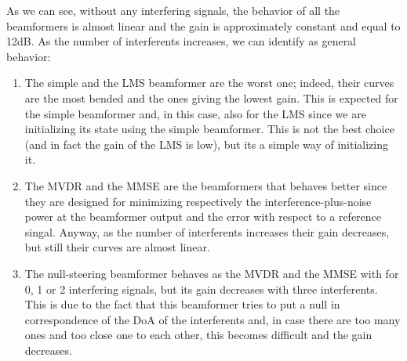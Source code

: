 As we can see, without any interfering signals, the behavior of all the beamformers is almost linear and the gain is 
approximately constant and equal to 12dB.
As the number of interferents increases, we can identify as general behavior:

\begin{enumerate}
    \item The simple and the LMS beamformer are the worst one; indeed, their curves are the most bended and the 
            ones giving the lowest gain. This is expected for the simple beamformer and, in this case, also for the LMS
            since we are initializing its state using the simple beamformer. This is not the best choice (and
            in fact the gain of the LMS is low), but its a simple way of initializing it.
    \item The MVDR and the MMSE are the beamformers that behaves better since they are designed for minimizing respectively the 
            interference-plus-noise power at the beamformer output and the error with respect to a reference singal. Anyway, as 
            the number of interferents increases their gain decreases, but still their curves are almost linear. 
    \item The null-steering beamformer behaves as the MVDR and the MMSE with for 0, 1 or 2 interfering signals, but its gain
            decreases with three interferents. This is due to the fact that this beamformer tries to put a null in correspondence
            of the DoA of the interferents and, in case there are too many ones and too close one to each other, this becomes 
            difficult and the gain decreases.
\end{enumerate}